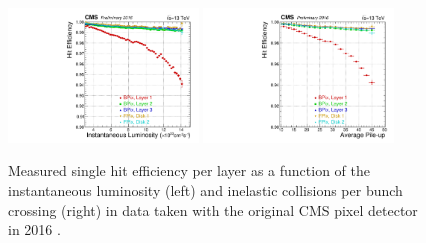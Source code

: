 \begin{figure}
\centering
\includegraphics[width=0.45\textwidth]{figures/lhc_and_cms/pixel_efficiency_vs_lumi_2016.pdf}
\hspace{5 mm}
\includegraphics[width=0.45\textwidth]{figures/lhc_and_cms/pixel_efficiency_vs_pu_2016.pdf}
\caption{Measured single hit efficiency per layer as a function of the instantaneous luminosity (left) and inelastic collisions per bunch crossing (right) in data taken with the original CMS pixel detector in 2016 \cite{pixel_performance_plots_2016}.}
\label{pixel_efficiency_2016}
\end{figure}